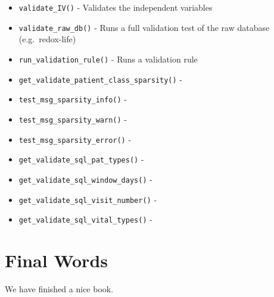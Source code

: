 \documentclass[
]{book}
\providecommand{\tightlist}{%
  \setlength{\itemsep}{0pt}\setlength{\parskip}{0pt}}
\begin{document}
\begin{itemize}
\tightlist
\item
  \texttt{validate\_IV()} - Validates the independent variables
\item
  \texttt{validate\_raw\_db()} - Runs a full validation test of the raw database (e.g.~redox-life)
\item
  \texttt{run\_validation\_rule()} - Runs a validation rule
\item
  \texttt{get\_validate\_patient\_class\_sparsity()} -
\item
  \texttt{test\_msg\_sparsity\_info()} -
\item
  \texttt{test\_msg\_sparsity\_warn()} -
\item
  \texttt{test\_msg\_sparsity\_error()} -
\item
  \texttt{get\_validate\_sql\_pat\_types()} -
\item
  \texttt{get\_validate\_sql\_window\_days()} -
\item
  \texttt{get\_validate\_sql\_visit\_number()} -
\item
  \texttt{get\_validate\_sql\_vital\_types()} -
\end{itemize}

\hypertarget{final-words}{%
\chapter{Final Words}\label{final-words}}

We have finished a nice book.

  
\end{document}
